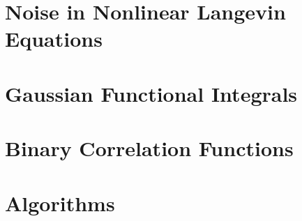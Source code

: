 \documentclass[12pt, letterpaper]{report}
\begin{document}
\appendix

\chapter{Noise in Nonlinear Langevin Equations}


\chapter{Gaussian Functional Integrals}


\chapter{Binary Correlation Functions}


\chapter{Algorithms}


\printbibliography
\end{document}
